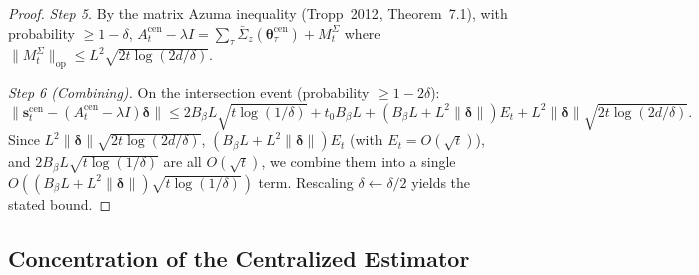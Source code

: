 \documentclass[11pt]{article}
\begin{document}
\begin{proof}
\textit{Step 5.}  By the matrix Azuma inequality (Tropp~2012,
Theorem~7.1), with probability $\geq 1-\delta$,
$A_t^{\mathrm{cen}}-\lambda I=\sum_\tau\bar{\Sigma}_z(\bm{\theta}_\tau^{\mathrm{cen}})+M_t^\Sigma$
where $\|M_t^\Sigma\|_{\mathrm{op}}\leq L^2\sqrt{2t\log(2d/\delta)}$.

\textit{Step 6 (Combining).}  On the intersection event
(probability $\geq 1-2\delta$):
\[
\|\bm{s}_t^{\mathrm{cen}}-(A_t^{\mathrm{cen}}-\lambda I)\bm{\delta}\|
\leq 2B_\beta L\sqrt{t\log(1/\delta)}+t_0 B_\beta L
+(B_\beta L+L^2\|\bm{\delta}\|)E_t
+L^2\|\bm{\delta}\|\sqrt{2t\log(2d/\delta)}.
\]
Since $L^2\|\bm{\delta}\|\sqrt{2t\log(2d/\delta)}$,
$(B_\beta L+L^2\|\bm{\delta}\|)E_t$ (with $E_t=O(\sqrt t)$), and
$2B_\beta L\sqrt{t\log(1/\delta)}$ are all $O(\sqrt{t})$,
we combine them into a single $O((B_\beta L+L^2\|\bm{\delta}\|)\sqrt{t\log(1/\delta)})$ term.
Rescaling $\delta\leftarrow\delta/2$ yields the stated
bound.
\end{proof}

\subsection{Concentration of the Centralized Estimator}
\end{document}
